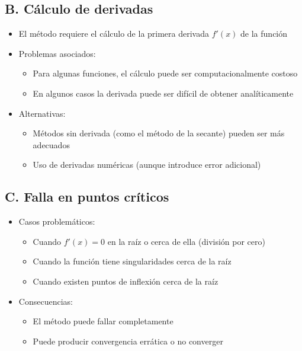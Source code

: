 \documentclass[conference]{IEEEtran}
\begin{document}
\subsection*{B. Cálculo de derivadas}
\begin{itemize}
    \item El método requiere el cálculo de la primera derivada $f'(x)$ de la función
    \item Problemas asociados:
    \begin{itemize}
        \item Para algunas funciones, el cálculo puede ser computacionalmente costoso
        \item En algunos casos la derivada puede ser difícil de obtener analíticamente
    \end{itemize}
    \item Alternativas:
    \begin{itemize}
        \item Métodos sin derivada (como el método de la secante) pueden ser más adecuados
        \item Uso de derivadas numéricas (aunque introduce error adicional)
    \end{itemize}
\end{itemize}

\subsection*{C. Falla en puntos críticos}
\begin{itemize}
    \item Casos problemáticos:
    \begin{itemize}
        \item Cuando $f'(x) = 0$ en la raíz o cerca de ella (división por cero)
        \item Cuando la función tiene singularidades cerca de la raíz
        \item Cuando existen puntos de inflexión cerca de la raíz
    \end{itemize}
    \item Consecuencias:
    \begin{itemize}
        \item El método puede fallar completamente
        \item Puede producir convergencia errática o no converger
    \end{itemize}
\end{itemize}
\end{document}
